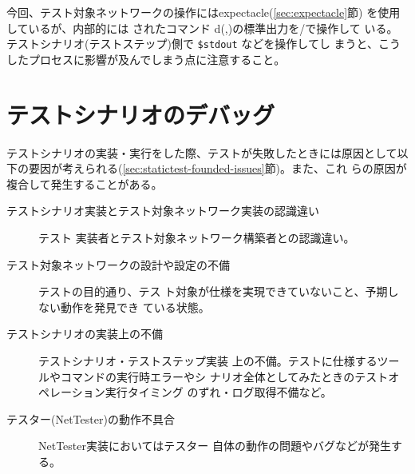 今回、テスト対象ネットワークの操作にはexpectacle(\ref{sec:expectacle}節)
を使用しているが、内部的には  されたコマンド
d(,)の標準出力を/で操作して
いる。テストシナリオ(テストステップ)側で \verb|$stdout| などを操作してし
まうと、こうしたプロセスに影響が及んでしまう点に注意すること。


 \section{テストシナリオのデバッグ}

テストシナリオの実装・実行をした際、テストが失敗したときには原因として以
下の要因が考えられる(\ref{sec:statictest-founded-issues}節)。また、これ
らの原因が複合して発生することがある。
\begin{description}
 \item[テストシナリオ実装とテスト対象ネットワーク実装の認識違い] テスト
            実装者とテスト対象ネットワーク構築者との認識違い。
 \item[テスト対象ネットワークの設計や設定の不備] テストの目的通り、テス
            ト対象が仕様を実現できていないこと、予期しない動作を発見でき
            ている状態。
 \item[テストシナリオの実装上の不備] テストシナリオ・テストステップ実装
            上の不備。テストに仕様するツールやコマンドの実行時エラーやシ
            ナリオ全体としてみたときのテストオペレーション実行タイミング
            のずれ・ログ取得不備など。
 \item[テスター(NetTester)の動作不具合] NetTester実装においてはテスター
            自体の動作の問題やバグなどが発生する。
\end{description}


